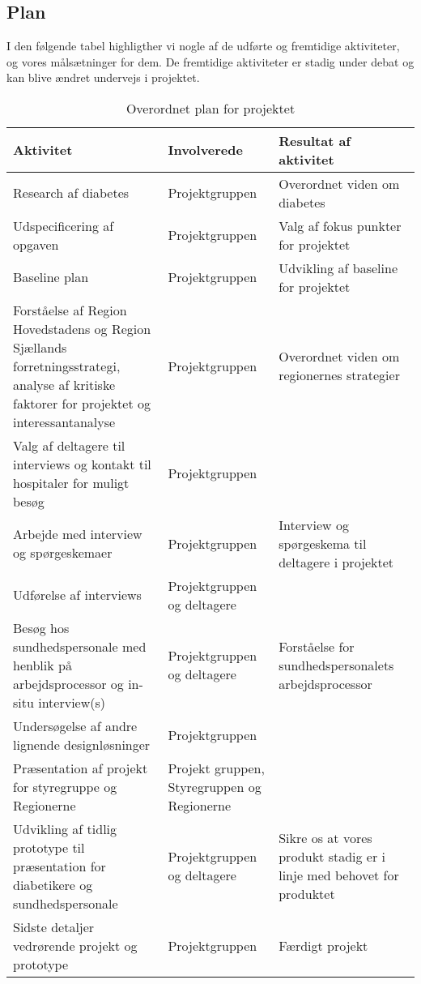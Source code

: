 \newpage
\subsection{Plan}
I den følgende tabel highligther vi nogle af de udførte og fremtidige aktiviteter, og vores målsætninger for dem. De fremtidige aktiviteter er stadig under debat og kan blive ændret undervejs i projektet.
\begin{table}[h!]
	\centering
	\begin{tabularx}{\textwidth}{|X|M|X|}
		\hline
		Aktivitet&Involverede&Resultat af aktivitet\\
		\hline
		Research af diabetes & Projektgruppen & Overordnet viden om diabetes\\
		\hline
		Udspecificering af opgaven & Projektgruppen & Valg af fokus punkter for projektet\\
		\hline
		Baseline plan & Projektgruppen & Udvikling af baseline for projektet\\
		\hline
		Forståelse af Region Hovedstadens og Region Sjællands forretningsstrategi, analyse af kritiske faktorer for projektet og interessantanalyse & Projektgruppen & Overordnet viden om regionernes strategier\\
		\hline
		Valg af deltagere til interviews og kontakt til hospitaler for muligt besøg & Projektgruppen & \\
		\hline
		Arbejde med interview og spørgeskemaer & Projektgruppen & Interview og spørgeskema til deltagere i projektet\\
		\hline
		Udførelse af interviews & Projektgruppen og deltagere & \\
		\hline
		Besøg hos sundhedspersonale med henblik på arbejdsprocessor og in-situ interview(s) & Projektgruppen og deltagere & Forståelse for sundhedspersonalets arbejdsprocessor\\
		\hline
		Undersøgelse af andre lignende designløsninger & Projektgruppen & \\
		\hline
		Præsentation af projekt for styregruppe og Regionerne & Projekt gruppen, Styregruppen og Regionerne & \\
		\hline
		Udvikling af tidlig prototype til præsentation for diabetikere og sundhedspersonale & Projektgruppen og deltagere & Sikre os at vores produkt stadig er i linje med behovet for produktet\\
		\hline
		Sidste detaljer vedrørende projekt og prototype & Projektgruppen & Færdigt projekt\\
		\hline
	\end{tabularx}
	\caption{Overordnet plan for projektet}
\end{table}